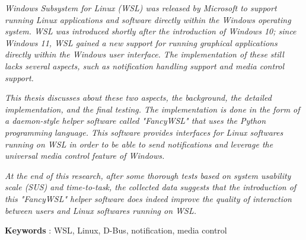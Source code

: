 \textit{
Windows Subsystem for Linux (WSL) was released by Microsoft to support running Linux applications and software directly within the Windows operating system. WSL was introduced shortly after the introduction of Windows 10; since Windows 11, WSL gained a new support for running graphical applications directly within the Windows user interface. The implementation of these still lacks several aspects, such as notification handling support and media control support.}

\textit{This thesis discusses about these two aspects, the background, the detailed implementation, and the final testing. The implementation is done in the form of a daemon-style helper software called "FancyWSL" that uses the Python programming language. This software provides interfaces for Linux softwares running on WSL in order to be able to send notifications and leverage the universal media control feature of Windows.}

\textit{At the end of this research, after some thorough tests based on system usability scale (SUS) and time-to-task, the collected data suggests that the introduction of this "FancyWSL" helper software does indeed improve the quality of interaction between users and Linux softwares running on WSL.}

\noindent\textbf{Keywords} : WSL, Linux, D-Bus, notification, media control

